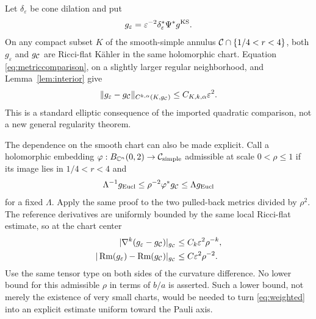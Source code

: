 Let $\delta_\varepsilon$ be cone dilation and put
\begin{equation}\label{eq:rescaled}
 g_\varepsilon=\varepsilon^{-2}\delta_\varepsilon^*\Psi^*g^{\mathrm{KS}}.
\end{equation}
On any compact subset $K$ of the smooth-simple annulus
$\mathcal C\cap\{1/4<r<4\}$, both $g_\varepsilon$ and $g_{\mathcal C}$ are
Ricci-flat K\"ahler in the same holomorphic chart. Equation
\eqref{eq:metriccomparison}, on a slightly larger regular neighborhood,
and Lemma~\ref{lem:interior} give
\begin{equation}\label{eq:all-derivatives}
 \|g_\varepsilon-g_{\mathcal C}\|_{C^{k,\alpha}(K,g_{\mathcal C})}
                         \le C_{K,k,\alpha}\varepsilon^2.
\end{equation}
This is a standard elliptic consequence of the imported quadratic
comparison, not a new general regularity theorem.

The dependence on the smooth chart can also be made explicit.
Call a holomorphic embedding
$\varphi:B_{\mathbb C^n}(0,2)\to\mathcal C_{\rm simple}$ admissible at
scale $0<\rho\le1$ if its image lies in $1/4<r<4$ and
\begin{equation}\label{eq:chartscale}
 \Lambda^{-1}g_{\rm Eucl}\le\rho^{-2}\varphi^*g_{\mathcal C}
                                     \le\Lambda g_{\rm Eucl}
\end{equation}
for a fixed $\Lambda$. Apply the same proof to the two pulled-back
metrics divided by $\rho^2$. The reference derivatives are uniformly
bounded by the same local Ricci-flat estimate, so at the chart center
\begin{align}\label{eq:weighted}
 |\nabla^k(g_\varepsilon-g_{\mathcal C})|_{g_{\mathcal C}}
   &\le C_k\varepsilon^2\rho^{-k},\\
 |\operatorname{Rm}(g_\varepsilon)-\operatorname{Rm}(g_{\mathcal C})|_{g_{\mathcal C}}
   &\le C\varepsilon^2\rho^{-2}.\nonumber
\end{align}
Use the same tensor type on both sides of the curvature difference.
No lower bound for this admissible $\rho$ in terms of $b/a$ is
asserted. Such a lower bound, not merely the existence of very small
charts, would be needed to turn \eqref{eq:weighted} into an explicit
estimate uniform toward the Pauli axis.

